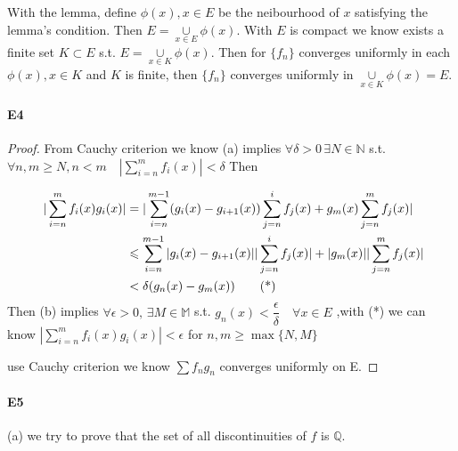 \documentclass{article}
\begin{document}
With the lemma, define  $ \phi(x),x\in E $ be the neibourhood of  $ x $ satisfying the lemma's condition.
Then  $ E=\mathop{\cup}\limits_{x\in E}\phi(x) $.
With  $ E  $ is compact we know exists a finite set  $ K\subset E $ s.t.  $ E=\mathop{\cup}\limits_{x\in K}\phi(x) $.
Then for  $ \{f_n\} $ converges uniformly in each  $ \phi(x),x\in K  $ and  $ K  $ is finite, then  $ \{f_n \}  $ converges uniformly 
in  $ \mathop{\cup}\limits_{x\in K}\phi(x)=E $.    
\paragraph{E4}
\begin{proof}
    From Cauchy criterion we know (a) implies  $\forall \delta>0\, \exists N\in\mathbb{N} $ s.t.  $ \forall n,m\geqslant N,n<m\quad |\sum\limits_{i=n}^{m} f_i(x)|<\delta $ Then 
    
        \begin{align}\
            |\sum\limits_{i=n }^{m } f_i(x)g_i(x)|&=|\sum\limits_{i=n}^{m-1}(g_i(x)-g_{i+1}(x))\sum\limits_{j=n}^{i}f_j(x)+g_m(x)\sum\limits_{j=n}^{m} f_j(x)|\notag\\
            & \leqslant  \sum\limits_{i=n}^{m-1}|g_i(x)-g_{i+1}(x)||\sum\limits_{j=n}^{i}f_j(x)|+|g_m(x)||\sum\limits_{j=n}^{m} f_j(x)|\notag\\
            &< \delta(g_n(x)-g_m(x))\tag{*}
        \end{align}
    Then (b) implies  $ \forall \epsilon>0,\,\exists M\in \mathbb{M} $ s.t.  $ g_n(x)< \dfrac{\epsilon}{\delta}\quad \forall x\in E  $ ,with (*) we can know  $ |\sum\limits_{i=n }^{m } f_i(x)g_i(x)| <\epsilon $ for  $ n,m\geqslant \max\{N,M\} $ 

    use Cauchy criterion we know  $ \sum f_ng_n $ converges uniformly on E.
\end{proof}
\paragraph[short]{E5}
(a) we try to prove that the set of all discontinuities of  $ f  $ is  $ \mathbb{Q } $. 
\end{document}

